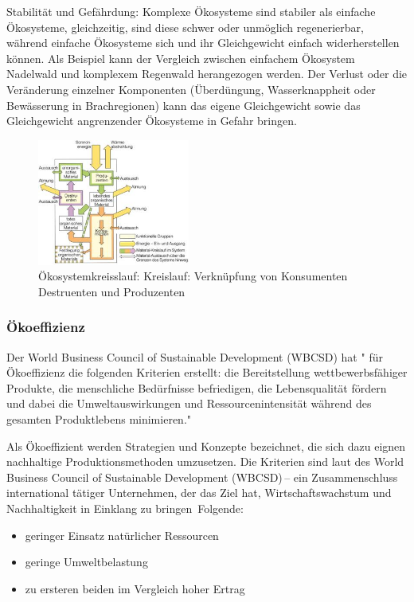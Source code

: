 \documentclass{article}
\begin{document}
Stabilität und Gefährdung: Komplexe Ökosysteme sind stabiler als einfache Ökosysteme, gleichzeitig, sind diese schwer oder unmöglich regenerierbar, während einfache Ökosysteme sich und ihr Gleichgewicht einfach widerherstellen können. Als Beispiel kann der Vergleich zwischen einfachem Ökosystem Nadelwald und komplexem Regenwald herangezogen werden.
Der Verlust oder die Veränderung einzelner Komponenten (Überdüngung, Wasserknappheit oder Bewässerung in Brachregionen) kann das eigene Gleichgewicht sowie das Gleichgewicht angrenzender Ökosysteme in Gefahr bringen. \cite{DefinitionWirtschaftslexikone}

\begin{figure}[htp]
\centering
\includegraphics[width=5cm]{image_folder/oekosystemkreisslauf.png}
\caption{Ökosystemkreisslauf: Kreislauf: Verknüpfung von Konsumenten Destruenten und Produzenten}
\label{fig:Ökosystemkreisslauf}
\end{figure}
        
\subsubsection{Ökoeffizienz}
 Der World Business Council of Sustainable Development (WBCSD) hat " für Ökoeffizienz die folgenden Kriterien erstellt: die Bereitstellung wettbewerbsfähiger Produkte, die menschliche Bedürfnisse befriedigen, die Lebensqualität fördern und dabei die Umweltauswirkungen und Ressourcenintensität während des gesamten Produktlebens minimieren." \cite{OkoeffizienzBrockhaus.de}

Als Ökoeffizient werden Strategien und Konzepte bezeichnet, die sich dazu eignen nachhaltige Produktionsmethoden umzusetzen. Die Kriterien sind laut des World Business Council of Sustainable Development (WBCSD) – ein Zusammenschluss international tätiger Unternehmen, der das Ziel hat, Wirtschaftswachstum und Nachhaltigkeit in Einklang zu bringen  Folgende:
\begin{itemize}
\item geringer Einsatz natürlicher Ressourcen
\item geringe Umweltbelastung
\item zu ersteren beiden im Vergleich hoher Ertrag
\end{itemize}
\end{document}
